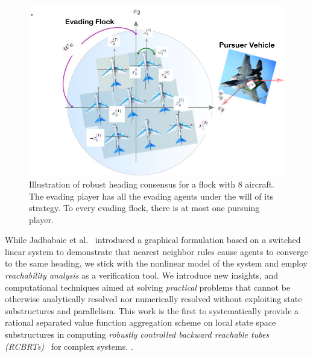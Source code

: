 \begin{figure}[tb!]
	\centering
	\includegraphics[width=\columnwidth]{figures/flock_pursuer.jpg}
	\caption{Illustration of robust heading consensus for a flock with 8 aircraft. The evading player has all the evading agents under the will of its strategy.  To every evading flock, there is at most one pursuing player. }
	\label{fig:robust_heading}
\end{figure}
%
While Jadbabaie et al.~\cite{JadbabaieCoord} introduced a graphical formulation based on a switched linear system to demonstrate that nearest neighbor rules cause agents to converge to the same heading, we stick with the nonlinear model of the system and employ \textit{reachability analysis} as a verification tool.  We introduce new insights, and computational techniques aimed at solving \textit{practical} problems that cannot be otherwise analytically resolved nor numerically resolved without exploiting state substructures and parallelism. This work is the first to systematically provide a rational separated value function aggregation  scheme on local state space substructures in computing \textit{robustly controlled backward reachable tubes  (RCBRTs)}~\cite{Mitchell2020} for complex systems. .  